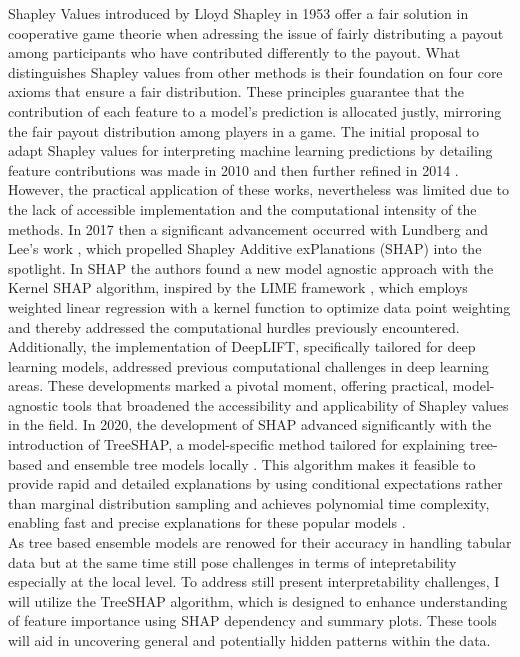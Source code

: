 \documentclass[12pt]{article}
\begin{document}
Shapley Values introduced by Lloyd Shapley in 1953 offer a fair solution in cooperative game theorie when adressing the issue of fairly distributing a payout among participants who have contributed differently to the payout.
What distinguishes Shapley values from other methods is their foundation on four core axioms that ensure a fair distribution. These principles guarantee that the contribution of each feature to a model's prediction is allocated justly, mirroring the fair payout distribution among players in a game. 
The initial proposal to adapt Shapley values for interpreting machine learning predictions by detailing feature contributions was made in 2010 \cite{article2} and then further refined in 2014 \cite{article3}.
However, the practical application of these works, nevertheless was limited due to the lack of accessible implementation and the computational intensity of the methods. 
In 2017 then a significant advancement occurred with Lundberg and Lee's work \cite{10.5555/3295222.3295230}, which propelled Shapley Additive exPlanations (SHAP) into the spotlight.
In SHAP the authors found a new model agnostic approach with the Kernel SHAP algorithm, inspired by the LIME framework \cite{10.1145/2939672.2939778}, which employs weighted linear regression with a kernel function to optimize data point weighting and thereby addressed the computational hurdles previously encountered.
Additionally, the implementation of DeepLIFT, specifically tailored for deep learning models, addressed previous computational challenges in deep learning areas. These developments marked a pivotal moment, offering practical, model-agnostic tools that broadened the accessibility and applicability of Shapley values in the field.
In 2020, the development of SHAP advanced significantly with the introduction of TreeSHAP, a model-specific method tailored for explaining tree-based and ensemble tree models locally  \cite{unknown}. 
This algorithm makes it feasible to provide rapid and detailed explanations by using conditional expectations rather than marginal distribution sampling and achieves polynomial time complexity, enabling fast and precise explanations for these popular models \cite{lundberg2019consistent}.\\
As tree based ensemble models are renowed for their accuracy in handling tabular data \cite{Chen_2016} \cite{grinsztajn2022treebased} \cite{lundberg2019explainable} but at the same time still pose challenges in terms of intepretability especially at the local level.
To address still present  interpretability challenges, I will utilize the TreeSHAP algorithm, which is designed to enhance understanding of feature importance using SHAP dependency and summary plots. These tools will aid in uncovering general and potentially hidden patterns within the data.
\end{document}
